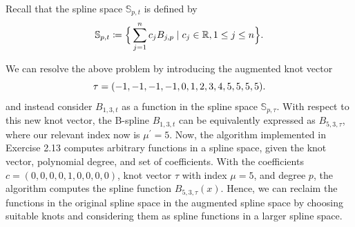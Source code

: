 \documentclass[a4paper]{article}
\begin{document}
    Recall that the spline space $\mathbb{S}_{p, t}$ is defined by
    \begin{equation}
        \notag
        \mathbb{S}_{p, t} \coloneqq \Big\{ \sum^{n}_{j=1} c_jB_{j, p} \mid c_j
        \in \mathbb{R}, 1 \leq j \leq n \Big\}.
    \end{equation}

    We can resolve the above problem by introducing the augmented knot vector 
    \begin{equation}
        \notag
        \tau = (-1, -1, -1, -1, 0, 1, 2, 3, 4, 5, 5, 5, 5).
    \end{equation}
    and instead consider $B_{1, 3, t}$ as a function in the spline space
    $\mathbb{S}_{p, \tau}$.  With respect to this new knot vector, the B-spline
    $B_{1, 3, t}$ can be equivalently expressed as $B_{5, 3, \tau}$, where our
    relevant index now is $\mu^\prime = 5$. Now, the algorithm implemented in
    Exercise 2.13 computes arbitrary functions in a spline space, given the
    knot vector, polynomial degree, and  set of coefficients.  With the
    coefficients $c = (0, 0, 0, 0, 1, 0, 0, 0, 0)$, knot vector $\tau$ with
    index $\mu = 5$, and degree $p$, the algorithm computes the spline function
    $B_{5, 3, \tau}(x)$. Hence, we can reclaim the functions in the original
    spline space in the augmented spline space by choosing suitable knots and
    considering them as spline functions in a larger spline space.
\end{document}
